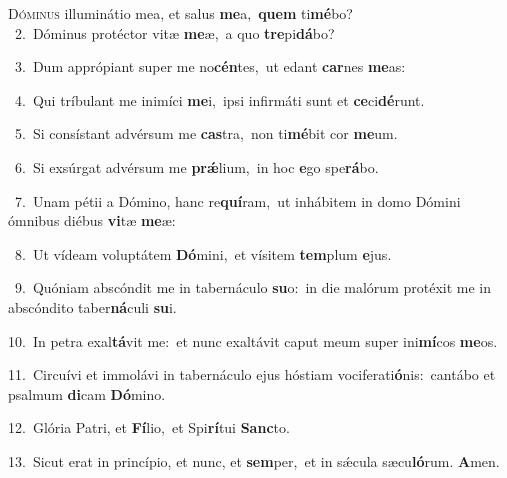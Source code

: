 \lettrine{\initial\textcolor{\initialcolor}{D}}{óminus} illuminátio mea, et salus \textbf{me}\-a,~\star \textbf{quem} ti\-\textbf{mé}\-bo?\\
{\numbfont\textcolor{\numbcolor}{~2.}}~Dóminus protéctor vitæ \textbf{me}\-æ,~\star a quo \textbf{tre}\-pi\-\textbf{dá}\-bo?\par
{\numbfont\textcolor{\numbcolor}{~3.}}~Dum apprópiant super me no\-\textbf{cén}\-tes,~\star ut edant \textbf{car}\-nes \textbf{me}\-as:\par
{\numbfont\textcolor{\numbcolor}{~4.}}~Qui tríbulant me inimíci \textbf{me}\-i,~\star ipsi infirmáti sunt et \textbf{ce}\-ci\-\textbf{dé}\-runt.\par
{\numbfont\textcolor{\numbcolor}{~5.}}~Si consístant advérsum me \textbf{cas}\-tra,~\star non ti\-\textbf{mé}\-bit cor \textbf{me}\-um.\par
{\numbfont\textcolor{\numbcolor}{~6.}}~Si exsúrgat advérsum me \textbf{prǽ}\-lium,~\star in hoc \textbf{e}\-go spe\-\textbf{rá}\-bo.\par
{\numbfont\textcolor{\numbcolor}{~7.}}~Unam pétii a Dómino, hanc re\-\textbf{quí}\-ram,~\star ut inhábitem in domo Dómini ómnibus diébus \textbf{vi}\-tæ \textbf{me}\-æ:\par
{\numbfont\textcolor{\numbcolor}{~8.}}~Ut vídeam voluptátem \textbf{Dó}\-mini,~\star et vísitem \textbf{tem}\-plum \textbf{e}\-jus.\par
{\numbfont\textcolor{\numbcolor}{~9.}}~Quóniam abscóndit me in tabernáculo \textbf{su}\-o:~\star in die malórum protéxit me in abscóndito taber\-\textbf{ná}\-culi \textbf{su}\-i.\par
{\numbfont\textcolor{\numbcolor}{10.}}~In petra exal\-\textbf{tá}\-vit me:~\star et nunc exaltávit caput meum super ini\-\textbf{mí}\-cos \textbf{me}\-os.\par
{\numbfont\textcolor{\numbcolor}{11.}}~Circuívi et immolávi in tabernáculo ejus hóstiam vociferati\-\textbf{ó}\-nis:~\star cantábo et psalmum \textbf{di}\-cam \textbf{Dó}\-mino.\par
{\numbfont\textcolor{\numbcolor}{12.}}~Glória Patri, et \textbf{Fí}\-lio,~\star et Spi\-\textbf{rí}\-tui \textbf{Sanc}\-to.\par
{\numbfont\textcolor{\numbcolor}{13.}}~Sicut erat in princípio, et nunc, et \textbf{sem}\-per,~\star et in sǽcula sæcu\-\textbf{ló}\-rum. \textbf{A}\-men.\par
